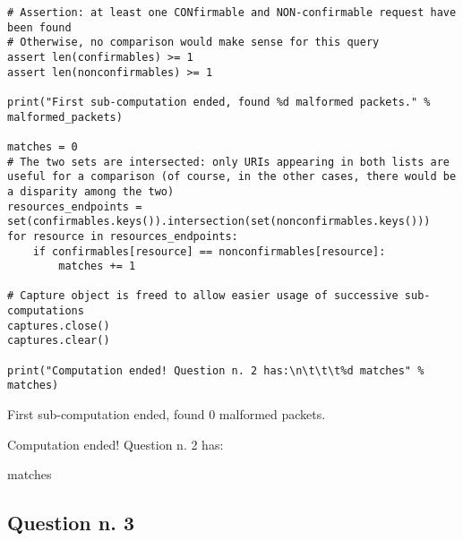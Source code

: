 \documentclass[a4paper,11pt]{article} %
\begin{document}
\begin{verbatim}
# Assertion: at least one CONfirmable and NON-confirmable request have been found
# Otherwise, no comparison would make sense for this query
assert len(confirmables) >= 1
assert len(nonconfirmables) >= 1

print("First sub-computation ended, found %d malformed packets." % malformed_packets)

matches = 0
# The two sets are intersected: only URIs appearing in both lists are useful for a comparison (of course, in the other cases, there would be a disparity among the two)
resources_endpoints = set(confirmables.keys()).intersection(set(nonconfirmables.keys()))
for resource in resources_endpoints:
    if confirmables[resource] == nonconfirmables[resource]:
        matches += 1

# Capture object is freed to allow easier usage of successive sub-computations
captures.close()
captures.clear()

print("Computation ended! Question n. 2 has:\n\t\t\t%d matches" % matches)
    \end{verbatim}

    \begin{tcolorbox}
        First sub-computation ended, found 0 malformed packets.

        Computation ended! Question n. 2 has:

        \qquad \qquad {} matches
    \end{tcolorbox}

    \subsection{Question n. 3}\label{subsec:question-n.-3}
\end{document}
